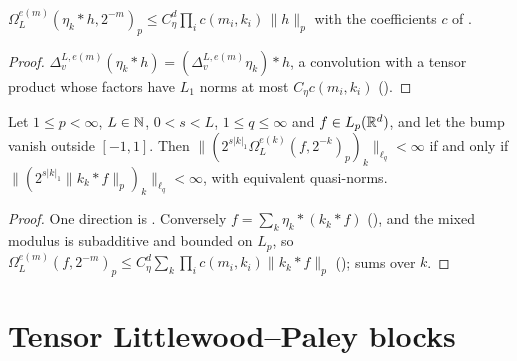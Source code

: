 \begin{lemma}
\label{lem:mixed-dual-moduli}
\leanok
{}
$\Omega^{e(m)}_L(\eta_k * h, 2^{-m})_p \leq C_\eta^d \prod_i c(m_i, k_i) \, \|h\|_p$ with the
coefficients $c$ of .
\end{lemma}

\begin{proof}
\leanok
$\Delta^{L, e(m)}_v (\eta_k * h) = (\Delta^{L, e(m)}_v \eta_k) * h$, a convolution with a tensor
product whose factors have $L_1$ norms at most $C_\eta c(m_i, k_i)$
().
\end{proof}

\begin{theorem}
\label{thm:mixed-local-means}
\leanok
{}
Let $1 \leq p < \infty$, $L \in \mathbb{N}$, $0 < s < L$, $1 \leq q \leq \infty$ and
$f \in L_p(\mathbb{R}^d)$, and let the bump vanish outside $[-1, 1]$. Then
$\|(2^{s|k|_1} \Omega^{e(k)}_L(f, 2^{-k})_p)_k\|_{\ell_q} < \infty$ if and only if
$\|(2^{s|k|_1} \|k_k * f\|_p)_k\|_{\ell_q} < \infty$, with equivalent quasi-norms.
\end{theorem}

\begin{proof}
\leanok
One direction is . Conversely
$f = \sum_k \eta_k * (k_k * f)$ (), and the mixed modulus is
subadditive and bounded on $L_p$, so
$\Omega^{e(m)}_L(f, 2^{-m})_p \leq C_\eta^d \sum_k \prod_i c(m_i, k_i) \|k_k * f\|_p$
();  sums over $k$.
\end{proof}

\section{Tensor Littlewood--Paley blocks}
\label{sec:mixed-lp-blocks}


